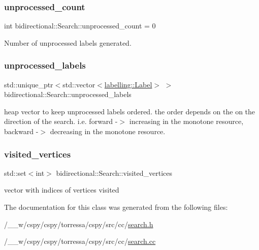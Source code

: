 \mbox{\label{classbidirectional_1_1Search_a5143275aff96ad18651c6050832a854a}} 
\subsubsection{\texorpdfstring{unprocessed\+\_\+count}{unprocessed\_count}}
{\footnotesize\ttfamily int bidirectional\+::\+Search\+::unprocessed\+\_\+count = 0}



Number of unprocessed labels generated. 

\mbox{\label{classbidirectional_1_1Search_aeb057642c57dde16fec701f625781651}} 
\subsubsection{\texorpdfstring{unprocessed\+\_\+labels}{unprocessed\_labels}}
{\footnotesize\ttfamily std\+::unique\+\_\+ptr$<$std\+::vector$<$\hyperlink{classlabelling_1_1Label}{labelling\+::\+Label}$>$ $>$ bidirectional\+::\+Search\+::unprocessed\+\_\+labels}

heap vector to keep unprocessed labels ordered. the order depends on the on the direction of the search. i.\+e. forward -\/$>$ increasing in the monotone resource, backward -\/$>$ decreasing in the monotone resource. \mbox{\label{classbidirectional_1_1Search_a7548a1928ca152017f6f4fe7a5c55089}} 
\subsubsection{\texorpdfstring{visited\+\_\+vertices}{visited\_vertices}}
{\footnotesize\ttfamily std\+::set$<$int$>$ bidirectional\+::\+Search\+::visited\+\_\+vertices}



vector with indices of vertices visited 



The documentation for this class was generated from the following files\+:\begin{DoxyCompactItemize}
\item 
/\+\_\+\+\_\+w/cspy/cspy/torressa/cspy/src/cc/\hyperlink{search_8h}{search.\+h}\item 
/\+\_\+\+\_\+w/cspy/cspy/torressa/cspy/src/cc/\hyperlink{search_8cc}{search.\+cc}\end{DoxyCompactItemize}
